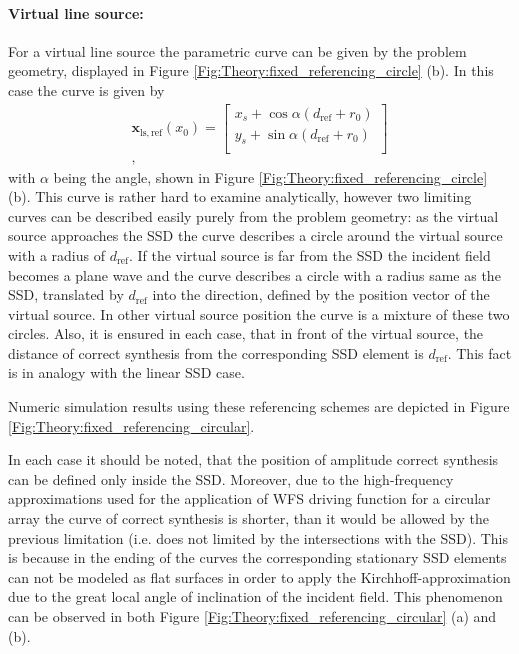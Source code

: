 \documentclass[12pt,a4paper]{article}
\newcommand{\dref}{d_{\mathrm{ref}}}
\begin{document}
\paragraph{Virtual line source:\\}
For a virtual line source the parametric curve can be given by the problem geometry, displayed in Figure \ref{Fig:Theory:fixed_referencing_circle} (b).
In this case the curve is given by
\begin{eqnarray}
\mathbf{x}_{\mathrm{ls,ref}}(x_0) =  \begin{bmatrix} x_s + \cos\alpha (\dref + r_0)\\[0.3em] y_s + \sin\alpha (\dref+r_0) \\[0.3em]    \end{bmatrix} \\,
\label{Eq:Fixed_referencing_ls_circle}
\end{eqnarray}
with $\alpha$ being the angle, shown in Figure \ref{Fig:Theory:fixed_referencing_circle} (b).
This curve is rather hard to examine analytically, however two limiting curves can be described easily purely from the problem geometry: as the virtual source approaches the SSD the curve describes a circle around the virtual source with a radius of $\dref$. If the virtual source is far from the SSD the incident field becomes a plane wave and the curve describes a circle with a radius same as the SSD, translated by $\dref$ into the direction, defined by the position vector of the virtual source. In other virtual source position the curve is a mixture of these two circles. Also, it is ensured in each case, that in front of the virtual source, the distance of correct synthesis from the corresponding SSD element is $\dref$. This fact is in analogy with the linear SSD case.

Numeric simulation results using these referencing schemes are depicted in Figure \ref{Fig:Theory:fixed_referencing_circular}.

In each case it should be noted, that the position of amplitude correct synthesis can be defined only inside the SSD. Moreover, due to the high-frequency approximations used for the application of WFS driving function for a circular array the curve of correct synthesis is shorter, than it would be allowed by the previous limitation (i.e. does not limited by the intersections with the SSD). This is because in the ending of the curves the corresponding stationary SSD elements can not be modeled as flat surfaces in order to apply the Kirchhoff-approximation due to the great local angle of inclination of the incident field. This phenomenon can be observed in both Figure \ref{Fig:Theory:fixed_referencing_circular} (a) and (b).
\end{document}
